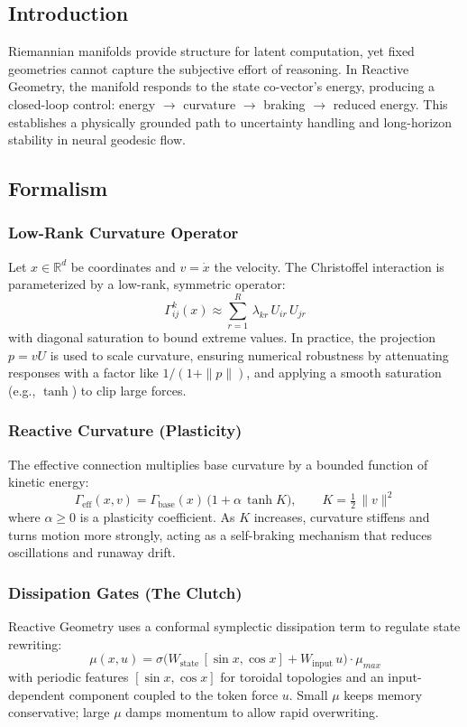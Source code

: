 \documentclass{article}
\numberwithin{equation}{section}
\begin{document}
\subsection{Introduction}
Riemannian manifolds provide structure for latent computation, yet fixed geometries cannot capture the subjective effort of reasoning. In Reactive Geometry, the manifold responds to the state co-vector’s energy, producing a closed-loop control: energy $\to$ curvature $\to$ braking $\to$ reduced energy. This establishes a physically grounded path to uncertainty handling and long-horizon stability in neural geodesic flow.

\subsection{Formalism}
\subsubsection{Low-Rank Curvature Operator}
Let $x\in\mathbb{R}^d$ be coordinates and $v=\dot{x}$ the velocity. The Christoffel interaction is parameterized by a low-rank, symmetric operator:
\[
\Gamma^k_{\!ij}(x) \approx \sum_{r=1}^{R}\,\lambda_{kr}\,U_{ir}\,U_{jr}
\]
with diagonal saturation to bound extreme values. In practice, the projection $p=vU$ is used to scale curvature, ensuring numerical robustness by attenuating responses with a factor like $1/(1+\|p\|)$, and applying a smooth saturation (e.g., $\tanh$) to clip large forces.

\subsubsection{Reactive Curvature (Plasticity)}
The effective connection multiplies base curvature by a bounded function of kinetic energy:
\[
\Gamma_{\text{eff}}(x,v) = \Gamma_{\text{base}}(x)\,\big(1+\alpha\,\tanh K\big),
\qquad K=\tfrac12\,\|v\|^2
\]
where $\alpha\ge 0$ is a plasticity coefficient. As $K$ increases, curvature stiffens and turns motion more strongly, acting as a self-braking mechanism that reduces oscillations and runaway drift.

\subsubsection{Dissipation Gates (The Clutch)}
Reactive Geometry uses a conformal symplectic dissipation term to regulate state rewriting:
\[
\mu(x,u) = \sigma\!\big(W_{\text{state}}\,[\sin x,\cos x] + W_{\text{input}}\,u\big)\cdot \mu_{max}
\]
with periodic features $[\sin x,\cos x]$ for toroidal topologies and an input-dependent component coupled to the token force $u$. Small $\mu$ keeps memory conservative; large $\mu$ damps momentum to allow rapid overwriting.
\end{document}
